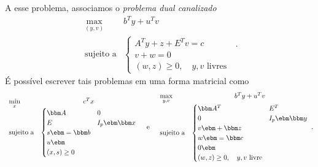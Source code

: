 A esse problema, associamos o \emph{problema dual canalizado}
\begin{equation}
\label{eq:introPL-dual-bounded}
\begin{array}{lc}
\displaystyle \max_{(y,v)} & b^Ty + u^{T}v \\
\text{sujeito a} &\begin{cases} A^Ty +z + E^Tv =  c \\
								v + w = 0 \\ 
				 (w,z)\geq 0, \quad y,v \text{ livres}	
				 \end{cases}\
\end{array}.
\end{equation}
É possível escrever tais problemas em uma forma matricial como 
\begin{equation*}
	\begin{array}{lc}
\displaystyle \min_{x} & c^Tx \\
\text{sujeito a} &\begin{cases} \bbm A & 0 \\ E & I_{p}\ebm \bbm x\\ s\ebm = \bbm b\\ u\ebm \\			 
				 (x, s) \geq 0	
				 \end{cases}
\end{array}
\quad \text{e} \quad \begin{array}{lc}
\displaystyle \max_{y,v} & b^Ty + u^{T}v \\
\text{sujeito a} &\begin{cases}  \bbm A^{T} & E^{T} \\ 0 & I_{p}\ebm \bbm y\\ v\ebm +\bbm z\\ w\ebm   = \bbm c\\ 0\ebm \\ 
				 (w,z)\geq 0, \quad y,v \text{ livre}	
				 \end{cases}
\end{array}.
\end{equation*}


